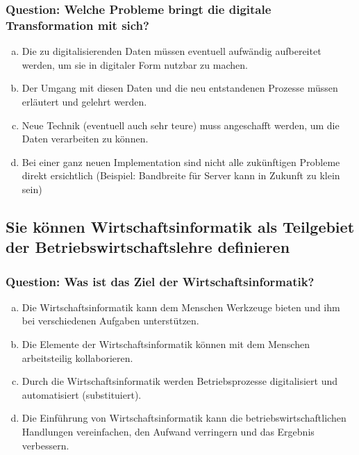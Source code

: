\documentclass{article}
\begin{document}
\begin{adjustwidth}{2em}{2em}
\begin{adjustwidth}{2em}{2em}
\begin{adjustwidth}{1em}{}
				\subsubsection*{Question: Welche Probleme bringt die digitale Transformation mit sich?}
				\begin{adjustwidth}{1em}{}
					\begin{enumerate}[(a)]
						\item Die zu digitalisierenden Daten müssen eventuell aufwändig aufbereitet werden, um sie in digitaler Form nutzbar zu machen.
						\item Der Umgang mit diesen Daten und die neu entstandenen Prozesse müssen erläutert und gelehrt werden.
						\item Neue Technik (eventuell auch sehr teure) muss angeschafft werden, um die Daten verarbeiten zu können.
						\item Bei einer ganz neuen Implementation sind nicht alle zukünftigen Probleme direkt ersichtlich (Beispiel: Bandbreite für Server kann in Zukunft zu klein sein)
					\end{enumerate}
				\end{adjustwidth}
			\end{adjustwidth}
			\subsection{Sie können Wirtschaftsinformatik als Teilgebiet der Betriebswirtschaftslehre definieren}
			\begin{adjustwidth}{1em}{}
				\subsubsection*{Question: Was ist das Ziel der Wirtschaftsinformatik?}
				\begin{adjustwidth}{1em}{}
					\begin{enumerate}[(a)]
						\item Die Wirtschaftsinformatik kann dem Menschen Werkzeuge bieten und ihm bei verschiedenen Aufgaben unterstützen.
						\item Die Elemente der Wirtschaftsinformatik können mit dem Menschen arbeitsteilig kollaborieren.
						\item Durch die Wirtschaftsinformatik werden Betriebsprozesse digitalisiert und automatisiert (substituiert).
						\item Die Einführung von Wirtschaftsinformatik kann die betriebswirtschaftlichen Handlungen vereinfachen, den Aufwand verringern und das Ergebnis verbessern.
					\end{enumerate}
				\end{adjustwidth}
			\end{adjustwidth}

\end{adjustwidth}
\end{adjustwidth}
\end{document}
